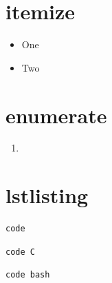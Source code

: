 \section{itemize}
\begin{itemize}
  \item One
  \item Two
\end{itemize}

\section{enumerate}
\begin{enumerate}
    \item
        \subitem
\end{enumerate}

\section{lstlisting}
\begin{lstlisting}[language=c++,caption={Exemple d'un bon programme d'allocation dynamique}]
code
\end{lstlisting}

\begin{lstlisting}[style=c,label={lst:xxx},caption={}]
 code C
\end{lstlisting}

\begin{lstlisting}[style=console,label={lst:xxx},caption={}]
 code bash
\end{lstlisting}

